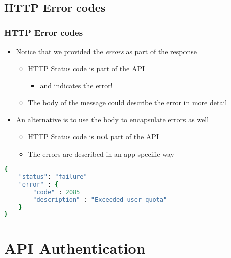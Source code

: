 \documentclass{beamer}
\begin{document}
\subsection{HTTP Error codes}
\begin{frame}[fragile]\frametitle{HTTP Error codes} 

  \begin{itemize}
    \item Notice that we provided the \textit{errors} as part of the response
    \begin{itemize}
      \item HTTP Status code is part of the API
      \begin{itemize}
        \item and indicates the error!
      \end{itemize}
      \item The body of the message could describe the error in more detail
    \end{itemize}

    \item An alternative is to use the body to encapsulate errors as well
    \begin{itemize}
      \item HTTP Status code is \textbf{not} part of the API
      \item The errors are described in an app-specific way
    \end{itemize}

  \end{itemize}

  \begin{lstlisting}[language=ruby, escapechar={^}]
{
    "status": "failure"
    "error" : {
        "code" : 2085
        "description" : "Exceeded user quota"
    }
}
  \end{lstlisting}

\end{frame}



\section{API Authentication}
\end{document}
